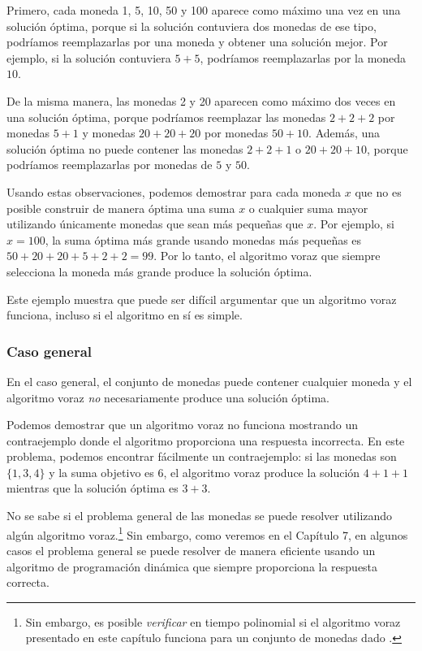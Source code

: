Primero, cada moneda 1, 5, 10, 50 y 100 aparece
como máximo una vez en una solución óptima,
porque si la solución contuviera dos monedas de ese tipo,
podríamos reemplazarlas por una moneda y
obtener una solución mejor.
Por ejemplo, si la solución contuviera
$5+5$, podríamos reemplazarlas por la moneda $10$.

De la misma manera, las monedas 2 y 20 aparecen
como máximo dos veces en una solución óptima,
porque podríamos reemplazar las
monedas $2+2+2$ por monedas $5+1$ y
monedas $20+20+20$ por monedas $50+10$.
Además, una solución óptima no puede contener
las monedas $2+2+1$ o $20+20+10$,
porque podríamos reemplazarlas por monedas de $5$ y $50$.

Usando estas observaciones,
podemos demostrar para cada moneda $x$ que
no es posible construir de manera óptima
una suma $x$ o cualquier suma mayor utilizando únicamente monedas
que sean más pequeñas que $x$.
Por ejemplo, si $x=100$, la suma óptima más grande
usando monedas más pequeñas es $50+20+20+5+2+2=99$.
Por lo tanto, el algoritmo voraz que siempre selecciona
la moneda más grande produce la solución óptima.

Este ejemplo muestra que puede ser difícil
argumentar que un algoritmo voraz funciona,
incluso si el algoritmo en sí es simple.

\subsubsection{Caso general}

En el caso general, el conjunto de monedas puede contener cualquier moneda
y el algoritmo voraz \emph{no} necesariamente produce
una solución óptima.

Podemos demostrar que un algoritmo voraz no funciona
mostrando un contraejemplo
donde el algoritmo proporciona una respuesta incorrecta.
En este problema, podemos encontrar fácilmente un contraejemplo:
si las monedas son $\{1,3,4\}$ y la suma objetivo
es 6, el algoritmo voraz produce la solución
$4+1+1$ mientras que la solución óptima es $3+3$.

No se sabe si el problema general de las monedas
se puede resolver utilizando algún algoritmo voraz.\footnote{Sin embargo, es posible
    \emph{verificar} en tiempo polinomial
    si el algoritmo voraz presentado en este capítulo funciona para
    un conjunto de monedas dado \cite{pea05}.}
Sin embargo, como veremos en el Capítulo 7,
en algunos casos
el problema general se puede resolver de manera eficiente
usando un algoritmo de programación dinámica que siempre proporciona la
respuesta correcta.


